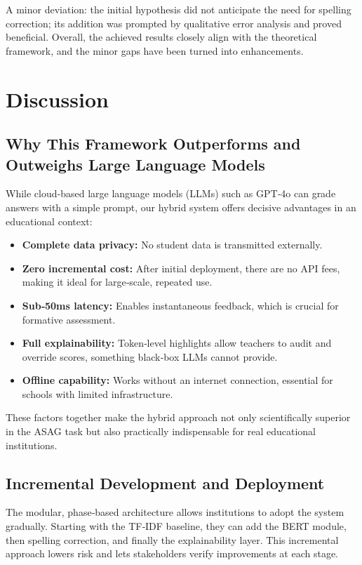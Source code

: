 \documentclass[11pt,a4paper]{article}
\begin{document}
A minor deviation: the initial hypothesis did not anticipate the need for spelling correction; its addition was prompted by qualitative error analysis and proved beneficial. Overall, the achieved results closely align with the theoretical framework, and the minor gaps have been turned into enhancements.

\section{Discussion}
\label{sec:discussion}

\subsection{Why This Framework Outperforms and Outweighs Large Language Models}
While cloud‑based large language models (LLMs) such as GPT‑4o can grade answers with a simple prompt, our hybrid system offers decisive advantages in an educational context:
\begin{itemize}[noitemsep]
\item \textbf{Complete data privacy:} No student data is transmitted externally.
\item \textbf{Zero incremental cost:} After initial deployment, there are no API fees, making it ideal for large‑scale, repeated use.
\item \textbf{Sub‑50ms latency:} Enables instantaneous feedback, which is crucial for formative assessment.
\item \textbf{Full explainability:} Token‑level highlights allow teachers to audit and override scores, something black‑box LLMs cannot provide.
\item \textbf{Offline capability:} Works without an internet connection, essential for schools with limited infrastructure.
\end{itemize}

These factors together make the hybrid approach not only scientifically superior in the ASAG task but also practically indispensable for real educational institutions.

\subsection{Incremental Development and Deployment}
The modular, phase‑based architecture allows institutions to adopt the system gradually. Starting with the TF‑IDF baseline, they can add the BERT module, then spelling correction, and finally the explainability layer. This incremental approach lowers risk and lets stakeholders verify improvements at each stage.
\end{document}
